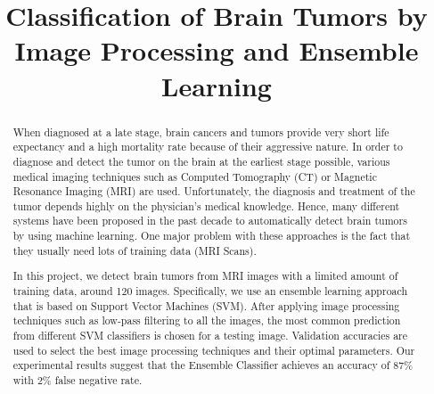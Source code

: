 \documentclass[conference]{IEEEtran}
\begin{document}
\title{Classification of Brain Tumors by Image Processing and Ensemble Learning\\}

\author{
\and
{}
\and
{}
}

\maketitle

\begin{abstract}
When diagnosed at a late stage, brain cancers and tumors provide very short life expectancy and a high mortality rate because of their aggressive nature. In order to diagnose and detect the tumor on the brain at the earliest stage possible, various medical imaging techniques such as Computed Tomography (CT) or Magnetic Resonance Imaging (MRI) are used. Unfortunately, the diagnosis and treatment of the tumor depends highly on the physician’s medical knowledge. Hence, many different systems have been proposed in the past decade to automatically detect brain tumors by using machine learning. One major problem with these approaches is the fact that they usually need lots of training data (MRI Scans).  

In this project, we detect brain tumors from MRI images with a limited amount of training data, around 120 images. Specifically, we use an ensemble learning approach that is based on Support Vector Machines (SVM). After applying image processing techniques such as low-pass filtering to all the images, the most common prediction from different SVM classifiers is chosen for a testing image. Validation accuracies are used to select the best image processing techniques and their optimal parameters. Our experimental results suggest that the Ensemble Classifier achieves an accuracy of 87\% with 2\% false negative rate.
\end{abstract}
\end{document}

